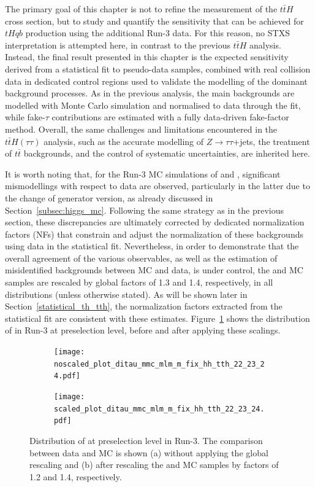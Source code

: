 The primary goal of this chapter is not to refine the measurement of the $t\bar{t}H$ cross section, but to study and quantify the sensitivity that can be achieved for $tHqb$ production using the additional Run-3 data. 
For this reason, no STXS interpretation is attempted here, in contrast to the previous $t\bar{t}H$ analysis. 
Instead, the final result presented in this chapter is the expected sensitivity derived from a statistical fit to pseudo-data samples, combined with real collision data in dedicated control regions used to validate the modelling of the dominant background processes. 
As in the previous analysis, the main backgrounds are modelled with Monte Carlo simulation and normalised to data through the fit, while fake-$\tau$ contributions are estimated with a fully data-driven fake-factor method. 
Overall, the same challenges and limitations encountered in the $t\bar{t}H(\tau\tau)$ analysis, such as the accurate modelling of $Z\to\tau\tau$+jets, the treatment of $t\bar{t}$ backgrounds, and the control of systematic uncertainties, are inherited here.

It is worth noting that, for the Run-3 MC simulations of \ttbar and \ztautau, significant mismodellings with respect to data are observed, particularly in the latter due to the change of generator version, as already discussed in Section~\ref{subsec:higgs_mc}. 
Following the same strategy as in the previous section, these discrepancies are ultimately corrected by dedicated normalization factors (NFs) that constrain and adjust the normalization of these backgrounds using data in the statistical fit. 
Nevertheless, in order to demonstrate that the overall agreement of the various observables, as well as the estimation of misidentified \tauhad backgrounds between MC and data, is under control, the \ttbar and \ztautau MC samples are rescaled by global factors of 1.3 and 1.4, respectively, in all distributions (unless otherwise stated). 
As will be shown later in Section~\ref{statistical_th_tth}, the normalization factors extracted from the statistical fit are consistent with these estimates. 
Figure~\ref{mmc_scaled} shows the distribution of \mmc in Run-3 at preselection level, before and after applying these scalings.

\begin{figure}[htbp]
    \centering
    \begin{subfigure}[b]{0.49\textwidth}
      \centering
      \texttt{[image: noscaled\_plot\_ditau\_mmc\_mlm\_m\_fix\_hh\_tth\_22\_23\_24.pdf]}
      \caption{}
    \end{subfigure}
    \hfill
    \begin{subfigure}[b]{0.49\textwidth}
      \centering
      \texttt{[image: scaled\_plot\_ditau\_mmc\_mlm\_m\_fix\_hh\_tth\_22\_23\_24.pdf]}
      \caption{}
    \end{subfigure}
    \caption{
      Distribution of \mmc at preselection level in Run-3. 
      The comparison between data and MC is shown (a) without applying the global rescaling and (b) after rescaling the \ttbar and \ztautau MC samples by factors of 1.2 and 1.4, respectively.
    }
    \label{mmc_scaled}
  \end{figure}
  
